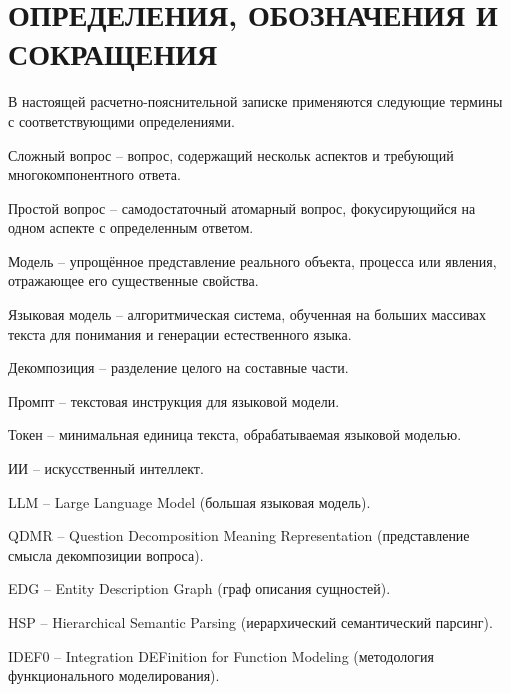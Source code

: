 \part*{ОПРЕДЕЛЕНИЯ, ОБОЗНАЧЕНИЯ И\\СОКРАЩЕНИЯ}
В настоящей расчетно-пояснительной записке применяются следующие термины с соответствующими определениями.

\begin{enumdescript}
	\item[Сложный вопрос] -- вопрос, содержащий нескольк аспектов и требующий многокомпонентного ответа.
	
	\item[Простой вопрос] -- самодостаточный атомарный вопрос, фокусирующийся на одном аспекте с определенным ответом.
	
	\item[Модель] -- упрощённое представление реального объекта, процесса или явления, отражающее его существенные свойства.
	
	\item[Языковая модель] -- алгоритмическая система, обученная на больших массивах текста для понимания и генерации естественного языка.
	
	\item[Декомпозиция] -- разделение целого на составные части.
	
	\item[Промпт] -- текстовая инструкция для языковой модели.
	
	\item[Токен] -- минимальная единица текста, обрабатываемая языковой моделью.
	
	\item[ИИ] -- искусственный интеллект.
	
	\item[LLM] -- Large Language Model (большая языковая модель).
	
	\item[QDMR] -- Question Decomposition Meaning Representation (представление смысла декомпозиции вопроса).
	
	\item[EDG] -- Entity Description Graph (граф описания сущностей).
	
	\item[HSP] -- Hierarchical Semantic Parsing (иерархический семантический парсинг).
	
	\item[IDEF0] -- Integration DEFinition for Function Modeling (методология функционального моделирования).
	

\end{enumdescript}
